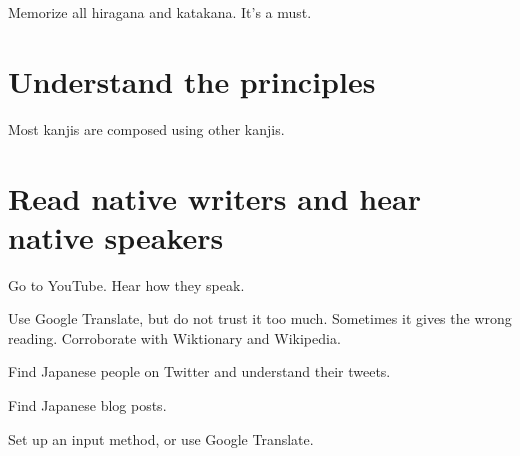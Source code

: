 \documentclass[12pt,openany]{book}
\begin{document}
Memorize all hiragana and katakana.
It's a must.

\section{Understand the principles}

Most kanjis are composed using other kanjis.

\section{Read native writers and hear native speakers}

Go to YouTube.
Hear how they speak.

Use Google Translate, but do not trust it too much.
Sometimes it gives the wrong reading.
Corroborate with Wiktionary and Wikipedia.

Find Japanese people on Twitter and understand their tweets.

Find Japanese blog posts.

Set up an input method, or use Google Translate.

\newcommand\myspacing{0.5em}
\newcommand\sbs[2]{%
    {%
        \parindent0em%
        \par%
        \vspace{\myspacing}%
        \begin{tabularx}{\linewidth}{XX}%
            {\fontsize{12pt}{12pt}\selectfont#1}%
            &%
            {\fontsize{10pt}{12pt}\selectfont#2}%
        \end{tabularx}%
        \vspace{\myspacing}%
        \par%
    }%
}


























\end{document}
